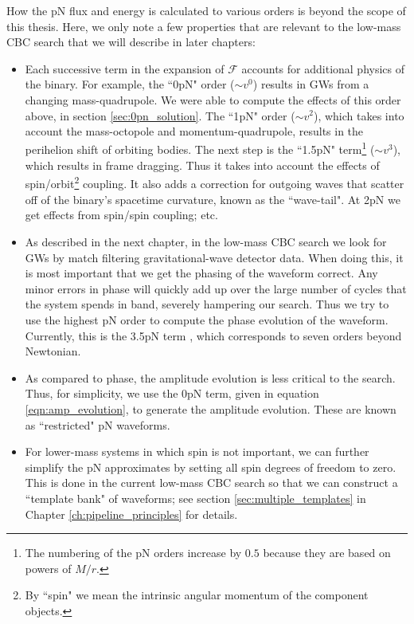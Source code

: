 How the \ac{pN} flux and energy is calculated to various orders is beyond the scope of this thesis. Here, we only note a few properties that are relevant to the low-mass \ac{CBC} search that we will describe in later chapters:
\begin{itemize}
\item{Each successive term in the expansion of $\mathcal{F}$ accounts for additional physics of the binary. For example, the ``0\ac{pN}" order ($\sim v^0$) results in \acp{GW} from a changing mass-quadrupole. We were able to compute the effects of this order above, in section \ref{sec:0pn_solution}. The ``1\ac{pN}" order ($\sim v^2$), which takes into account the mass-octopole and momentum-quadrupole, results in the perihelion shift of orbiting bodies. The next step is the ``1.5\ac{pN}" term\footnote{The numbering of the \ac{pN} orders increase by $0.5$ because they are based on powers of $M/r$.} ($\sim v^3$), which results in frame dragging. Thus it takes into account the effects of spin/orbit\footnote{By ``spin" we mean the intrinsic angular momentum of the component objects.} coupling. It also adds a correction for outgoing waves that scatter off of the binary's spacetime curvature, known as the ``wave-tail". At 2\ac{pN} we get effects from spin/spin coupling; etc.}
\item{As described in the next chapter, in the low-mass \ac{CBC} search we look for \acp{GW} by match filtering gravitational-wave detector data. When doing this, it is most important that we get the phasing of the waveform correct. Any minor errors in phase will quickly add up over the large number of cycles that the system spends in band, severely hampering our search. Thus we try to use the highest \ac{pN} order to compute the phase evolution of the waveform. Currently, this is the 3.5\ac{pN} term \cite{Blanchet:2006av}, which corresponds to seven orders beyond Newtonian.}
\item{As compared to phase, the amplitude evolution is less critical to the search. Thus, for simplicity, we use the 0\ac{pN} term, given in equation \ref{eqn:amp_evolution}, to generate the amplitude evolution. These are known as ``restricted" \ac{pN} waveforms.}
\item{For lower-mass systems in which spin is not important, we can further simplify the \ac{pN} approximates by setting all spin degrees of freedom to zero. This is done in the current low-mass \ac{CBC} search so that we can construct a ``template bank" of waveforms; see section \ref{sec:multiple_templates} in Chapter \ref{ch:pipeline_principles} for details.}
\end{itemize}

